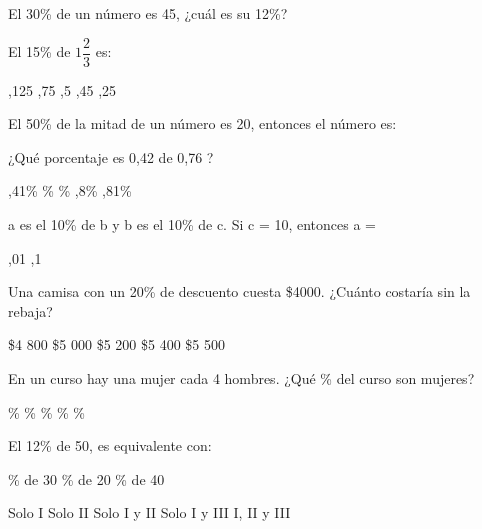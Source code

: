 \documentclass[pagina vacia]{srs}
\begin{document}
\begin{preguntas}[after-item-skip=2cm]
\pregunta El 30\% de un número es 45, ¿cuál es su 12\%?
\begin{vertical}
\end{vertical}

\pregunta El 15\% de \(1\dfrac{2}{3}\) es:
\begin{vertical}
,125
,75
,5
,45
,25
\end{vertical}

\pregunta El 50\% de la mitad de un número es 20, entonces el número es:
\begin{vertical}
\end{vertical}

\pregunta ¿Qué porcentaje es 0,42 de 0,76 ?
\begin{vertical}
,41\%
\%
\%
,8\%
,81\%
\end{vertical}

\pregunta a es el 10\% de b y b es el 10\% de c. Si c = 10, entonces a =
\begin{vertical}
,01
,1
\end{vertical}

\pregunta Una camisa con un 20\% de descuento cuesta \$4000. ¿Cuánto costaría sin la rebaja?
\begin{vertical}
\alternativa \$4 800
\alternativa \$5 000
\alternativa \$5 200
\alternativa \$5 400
\alternativa \$5 500
\end{vertical}

\pregunta En un curso hay una mujer cada 4 hombres. ¿Qué \% del curso son mujeres?
\begin{vertical}
\%
\%
\%
\%
\%
\end{vertical}

\pregunta El 12\% de 50, es equivalente con:
\begin{verticali}
\% de 30
\% de 20
\% de 40
\end{verticali}
\begin{vertical}
\alternativa Solo I
\alternativa Solo II
\alternativa Solo I y II
\alternativa Solo I y III
\alternativa I, II y III
\end{vertical}


\end{preguntas}
\end{document}
